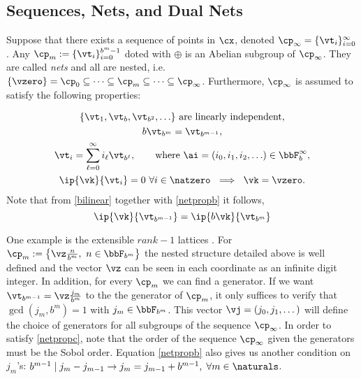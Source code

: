 \documentclass[]{elsarticle}
\theoremstyle{definition}
\begin{document}
\subsection{Sequences, Nets, and Dual Nets}
Suppose that there exists a sequence of points in $\cx$, denoted $\cp_\infty =\{\vt_i\}_{i=0}^{\infty}$. Any $\cp_m := \{\vt_i\}_{i=0}^{b^m-1}$ doted with $\oplus$ is an Abelian subgroup of $\cp_\infty$. They are called \emph{nets} and all are nested, i.e. $\{\vzero\}=\cp_0\subseteq\dots\subseteq\cp_m\subseteq\dots\subseteq\cp_\infty$. Furthermore, $\cp_\infty$ is assumed to satisfy the following properties:

\begin{subequations} \label{cpinfvector}
\begin{gather}
\{\vt_{1}, \vt_{b}, \vt_{b^2}, \ldots\} \text{ are linearly independent}, \\
b\vt_{b^m}=\vt_{b^{m-1}},\label{netpropb}\\
\vt_i = \sum_{\ell=0}^{\infty} i_\ell \vt_{b^\ell}, \qquad \text{where }\ai=(i_0, i_1, i_2, \ldots ) \in \bbF_b^\infty, \label{netpropc}\\
\ip{\vk}{\vt_i} =  0 \ \forall i \in \natzero   \ \implies \ \vk=\vzero. \label{netpropd}
\end{gather}
\end{subequations}
Note that from \eqref{bilinear} together with \eqref{netpropb} it follows,
\begin{equation}\label{assumgenip}
\ip{\vk}{\vt_{b^{m-1}}}=\ip{b\vk}{\vt_{b^m}}
\end{equation}

One example is the extensible $rank-1$ lattices \cite{HicNie03a}. For $\cp_m :=\left\{\vz\frac{n}{b^m},\ n\in\bbF_{b^m}\right\}$ the nested structure detailed above is well defined and the vector $\vz$ can be seen in each coordinate as an infinite digit integer. In addition, for every $\cp_m$ we can find a generator. If we want $\vt_{b^{m-1}}=\vz\frac{j_m}{b^m}$ to the the generator of $\cp_m$, it only suffices to verify that $\gcd(j_m,b^m)=1$ with $j_m\in\bbF_{b^m}$. This vector $\vj=(j_0,j_1,\dots)$ will define the choice of generators for all subgroups of the sequence $\cp_\infty$. In order to satisfy \eqref{netpropc}, note that the order of the sequence $\cp_\infty$ given the generators must be the Sobol order. Equation \eqref{netpropb} also gives us another condition on $j_m$'s: $ b^{m-1} \mid j_m-j_{m-1}\rightarrow j_m=j_{m-1}+b^{m-1},\;\forall m\in\naturals$.
\end{document}
